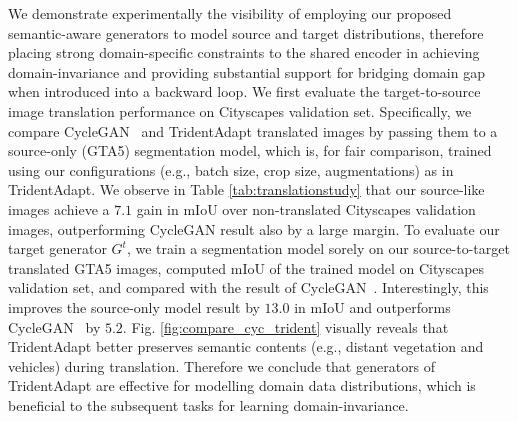 \documentclass{bmvc2k}
\newcommand{\Fig}[1]{Fig. \ref{fig:#1}}
\newcommand{\Tab}[1]{Table \ref{tab:#1}}
\begin{document}
We demonstrate experimentally the visibility of employing our proposed semantic-aware generators to model source and target distributions, therefore placing strong domain-specific constraints to the shared encoder in achieving domain-invariance and providing substantial support for bridging domain gap when introduced into a backward loop. We first evaluate the target-to-source image translation performance on Cityscapes validation set. Specifically, we compare CycleGAN~\cite{zhu2017unpaired} and TridentAdapt translated images by passing them to a source-only (GTA5) segmentation model, which is, for fair comparison, trained using our configurations (e.g., batch size, crop size, augmentations) as in TridentAdapt. We observe in \Tab{translationstudy} that our source-like images achieve a $7.1$ gain in mIoU over non-translated Cityscapes validation images, outperforming CycleGAN result also by a large margin.
To evaluate our target generator $G^{t}$, we train a segmentation model sorely on our source-to-target translated GTA5 images, computed mIoU of the trained model on Cityscapes validation set, and compared with the result of CycleGAN~\cite{zhu2017unpaired}. Interestingly, this improves the source-only model result by $13.0$ in mIoU and outperforms CycleGAN~\cite{zhu2017unpaired} by $5.2$.
\Fig{compare_cyc_trident} visually reveals that TridentAdapt better preserves semantic contents (e.g., distant vegetation and vehicles) during translation. Therefore we conclude that generators of TridentAdapt are effective for modelling domain data distributions, which is beneficial to the subsequent tasks for learning domain-invariance.
\end{document}

